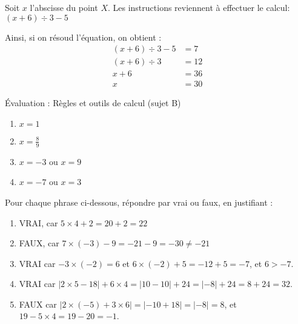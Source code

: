 \documentclass[noheader]{évaluation}
\begin{document}
\begin{exercice}
	Soit $x$ l'abscisse du point $X$. Les instructions reviennent à effectuer le calcul: $ (x + 6) ÷ 3 - 5 $

	Ainsi, si on résoud l'équation, on obtient :
	\begin{align*}
		(x + 6) ÷ 3 - 5 & = 7  \\
		(x + 6) ÷ 3     & = 12 \\
		x + 6           & = 36 \\
		x               & = 30
	\end{align*}
\end{exercice}

\newpage

\setcounter{exercice}{1}

\begin{center}
	\LARGE Évaluation : Règles et outils de calcul (sujet B)
\end{center}

\begin{exercice}
	\begin{multicols}{2}
		\begin{enumerate}
			\item $x = 1$
			\item $x = \frac{8}{9}$
			\item $x = -3$ ou $x = 9$
			\item $x = -7$ ou $x = 3$
		\end{enumerate}
	\end{multicols}
\end{exercice}

\begin{exercice}
	Pour chaque phrase ci-dessous, répondre par vrai ou faux, en justifiant :
	\begin{enumerate}
		\item VRAI, car $5 × 4 + 2 = 20 + 2 = 22$
		\item FAUX, car $7 × (-3) - 9 = -21 - 9 = -30 ≠ -21$
		\item VRAI car $-3 × (-2) = 6$ et $6 × (-2) + 5 = -12 + 5 = -7$, et $6 > -7$.
		\item VRAI car $|2 × 5 - 18| + 6 × 4 = |10 - 10| + 24 = |{-}8| + 24 = 8 + 24 = 32$.
		\item FAUX car $|2 × (-5) + 3 × 6| = |{-}10 + 18| = |{-}8| = 8$, et $19 - 5 × 4 = 19 - 20 = -1$.
	\end{enumerate}
\end{exercice}
\end{document}
